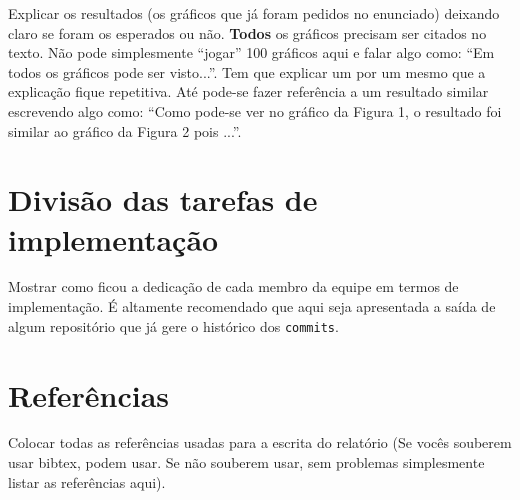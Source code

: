 \documentclass[12pt,a4paper]{article}
\begin{document}
Explicar os resultados (os gráficos que já foram pedidos no
enunciado) deixando claro se foram os esperados ou não. \textbf{Todos}
os gráficos precisam ser citados no texto. Não pode simplesmente
``jogar'' 100 gráficos aqui e falar algo como: ``Em todos os gráficos
pode ser visto...''. Tem que explicar um por um mesmo que a explicação
fique repetitiva. Até pode-se fazer referência a um resultado similar
escrevendo algo como: ``Como pode-se ver no gráfico da Figura 1, o
resultado foi similar ao gráfico da Figura 2 pois ...''.

\section{Divisão das tarefas de implementação}

Mostrar como ficou a dedicação de cada membro da equipe em termos de
implementação. É altamente recomendado que aqui seja apresentada a
saída de algum repositório que já gere o histórico dos
\texttt{commits}.

\section{Referências}

Colocar todas as referências usadas para a escrita do relatório (Se
vocês souberem usar bibtex, podem usar. Se não souberem usar, sem
problemas simplesmente listar as referências aqui).
\end{document}
